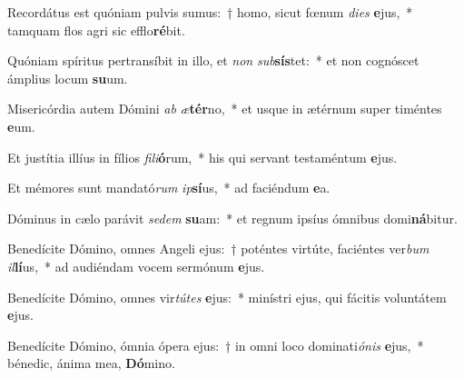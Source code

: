 \item Recordátus est quóniam pulvis sumus:~† homo, sicut fœnum \textit{di}\textit{es} \textbf{e}jus,~* tamquam flos agri sic efflo\textbf{ré}bit.
\item Quóniam spíritus pertransíbit in illo, et \textit{non} \textit{sub}\textbf{sís}tet:~* et non cognóscet ámplius locum \textbf{su}um.
\item Misericórdia autem Dómini \textit{ab} \textit{æ}\textbf{tér}no,~* et usque in ætérnum super timéntes \textbf{e}um.
\item Et justítia illíus in fílios \textit{fi}\textit{li}\textbf{ó}rum,~* his qui servant testaméntum \textbf{e}jus.
\item Et mémores sunt mandató\textit{rum} \textit{ip}\textbf{sí}us,~* ad faciéndum \textbf{e}a.
\item Dóminus in cælo parávit \textit{se}\textit{dem} \textbf{su}am:~* et regnum ipsíus ómnibus domi\textbf{ná}bitur.
\item Benedícite Dómino, omnes Angeli ejus:~† poténtes virtúte, faciéntes ver\textit{bum} \textit{il}\textbf{lí}us,~* ad audiéndam vocem sermónum \textbf{e}jus.
\item Benedícite Dómino, omnes vir\textit{tú}\textit{tes} \textbf{e}jus:~* minístri ejus, qui fácitis voluntátem \textbf{e}jus.
\item Benedícite Dómino, ómnia ópera ejus:~† in omni loco dominati\textit{ó}\textit{nis} \textbf{e}jus,~* bénedic, ánima mea, \textbf{Dó}mino.
